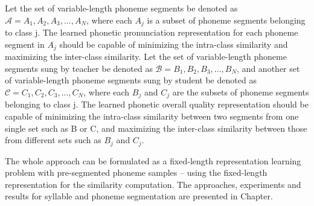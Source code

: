 Let the set of variable-length phoneme segments be denoted as $\mathcal{A} = {A_1, A_2, A_3, ..., A_N}$, where each $A_j$ is a subset of phoneme segments belonging to class j. The learned phonetic pronunciation representation for each phoneme segment in $A_j$ should be capable of minimizing the intra-class similarity and maximizing the inter-class similarity. Let the set of variable-length phoneme segments sung by teacher be denoted as $\mathcal{B}={B_1, B_2, B_3, ..., B_{N}}$, and another set of variable-length phoneme segments sung by student be denoted as $\mathcal{C}={C_1, C_2, C_3, ..., C_{N}}$, where each $B_j$ and $C_j$ are the subsets of phoneme segments belonging to class j. The learned phonetic overall quality representation should be capable of minimizing the intra-class similarity between two segments from one single set such as B or C, and maximizing the inter-class similarity between those from different sets such as $B_j$ and $C_j$. 

The whole approach can be formulated as a fixed-length representation learning problem with pre-segmented phoneme samples -- using the fixed-length representation for the similarity computation. The approaches, experiments and results for syllable and phoneme segmentation are presented in Chapter.
